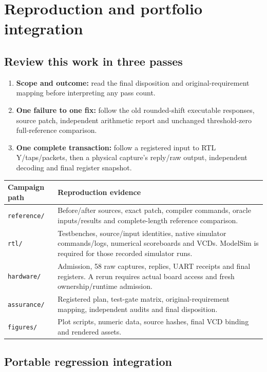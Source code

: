 \documentclass[11pt,letterpaper]{article}
\newcommand{\page}[1]{\clearpage\section{#1}}
\newcommand{\epath}[1]{\nolinkurl{#1}}
\begin{document}
\page{Reproduction and portfolio integration}
\subsection{Review this work in three passes}
\begin{enumerate}
\item \textbf{Scope and outcome:} read the final disposition and original-requirement mapping before interpreting any pass count.
\item \textbf{One failure to one fix:} follow the old rounded-shift executable responses, source patch, independent arithmetic report and unchanged threshold-zero full-reference comparison.
\item \textbf{One complete transaction:} follow a registered input to RTL Y/taps/packets, then a physical capture's reply/raw output, independent decoding and final register snapshot.
\end{enumerate}
\par\noindent\begin{minipage}{\linewidth}
\noindent\begin{tabularx}{\linewidth}{P{1.32in}L}
\toprule
\textbf{Campaign path} & \textbf{Reproduction evidence}\\
\midrule
\epath{reference/} & Before/after sources, exact patch, compiler commands, oracle inputs/results and complete-length reference comparison.\\
\epath{rtl/} & Testbenches, source/input identities, native simulator commands/logs, numerical scoreboards and VCDs. ModelSim is required for those recorded simulator runs.\\
\epath{hardware/} & Admission, 58 raw captures, replies, UART receipts and final registers. A rerun requires actual board access and fresh ownership/runtime admission.\\
\epath{assurance/} & Registered plan, test-gate matrix, original-requirement mapping, independent audits and final disposition.\\
\epath{figures/} & Plot scripts, numeric data, source hashes, final VCD binding and rendered assets.\\
\bottomrule
\end{tabularx}\par\end{minipage}\par
\subsection{Portable regression integration}

\end{document}
